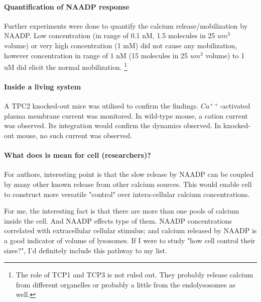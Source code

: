 \documentclass[twocolumn]{article}
\begin{document}
\paragraph{Quantification of NAADP response} Further experiments were done to
quantify the calcium release/mobilization by NAADP. Low concentration (in range
of 0.1 nM, 1.5 molecules in 25 $um^3$ volume) or very high concentration  (1 mM)
did not cause any mobilization, however concentration in range of 1 nM (15
molecules in 25 $um^3$ volume) to 1 uM did  elicit the normal mobilization.
\footnote{The role of TCP1 and TCP3 is not ruled out. They probably release
    calcium from different organelles or probably a little from the
    endolysosomes as well.}

\paragraph{Inside a living system}
A TPC2 knocked-out mice was utilised to confirm the findings.
$Ca^{++}$-activated plasma membrane current was monitored. In wild-type mouse, a
cation current was observed. Its integration would confirm the dynamics
observed. In knocked-out mouse, no such current was observed.

\paragraph{What does is mean for cell (researchers)?}
For authors, interesting point is that the slow release by NAADP can be coupled
by many other known release from other calcium sources. This would enable cell
to construct more versatile "control" over intera-cellular  calcium
concentrations.  

For me, the interesting fact is that there are more than one pools of calcium
inside the cell. And NAADP effects type of them. NAADP concentrations correlated
with extracellular cellular stimulus; and calcium released by NAADP is a good
indicator of volume of lysosomes. If I were to study "how cell control their
sizes?", I'd definitely include this pathway to my list.


        
\end{document}
